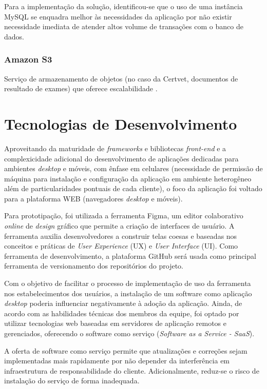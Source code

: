 \documentclass[
    12pt,               %
    openright,          %
    oneside,
    a4paper,            %
    BIBLATEX,           %
    TODO,               %
    english,            %
    brazil              %
    ]{ifsp-spo-inf-ctds}
\begin{document}
            Para a implementação da solução, identificou-se que o uso de uma instância MySQL se enquadra melhor às necessidades da aplicação por não existir necessidade imediata de atender altos volume de transações com o banco de dados.
            
        \subsubsection{Amazon S3}
        
            Serviço de armazenamento de objetos (no caso da Certvet, documentos de resultado de exames) que oferece escalabilidade . 

    \section{Tecnologias de Desenvolvimento}
    
        Aproveitando da maturidade de \emph{frameworks} e bibliotecas \emph{front-end} e a complexicidade adicional do desenvolvimento de aplicações dedicadas para ambientes \emph{desktop} e móveis, com ênfase em celulares (necessidade de permissão de máquina para instalação e configuração da aplicação em ambiente heterogêneo além de particularidades pontuais de cada cliente), o foco da aplicação foi voltado para a plataforma WEB (navegadores \emph{desktop} e móveis).
        
        Para prototipação, foi utilizada a ferramenta Figma, um editor colaborativo \emph{online} de \emph{design} gráfico que permite a criação de interfaces de usuário. A ferramenta auxilia desenvolvedores a construir telas coesas e baseadas nos conceitos e práticas de \emph{User Experience} (UX) e \emph{User Interface }(UI). Como ferramenta de desenvolvimento, a plataforma GitHub será usada como principal ferramenta de versionamento dos  repositórios do projeto.
        
        Com o objetivo de facilitar o processo de implementação de uso da ferramenta nos estabelecimentos dos usuários, a instalação de um software como aplicação \emph{desktop} poderia influenciar negativamente à adoção da aplicação. Ainda, de acordo com as habilidades técnicas dos membros da equipe, foi optado por utilizar tecnologias web baseadas em servidores de aplicação remotos e gerenciados, oferecendo o software como serviço (\emph{Software as a Service - SaaS}).
        
        A oferta de software como serviço permite que atualizações e correções sejam implementadas mais rapidamente por não depender da interferência em infraestrutura de responsabilidade do cliente. Adicionalmente, reduz-se o risco de instalação do serviço de forma inadequada.
\end{document}
